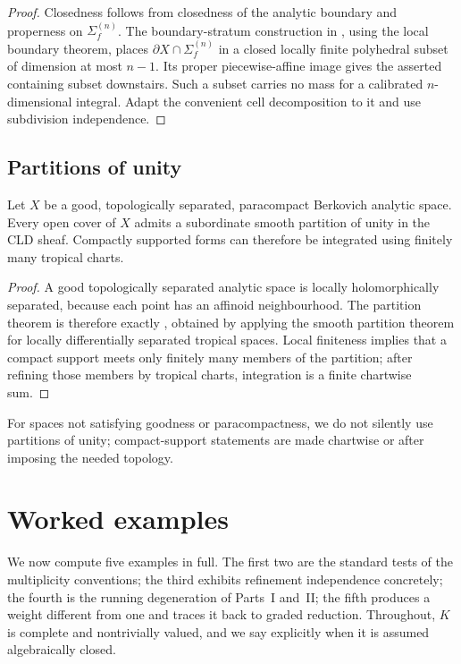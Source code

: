 \begin{proof}
Closedness follows from closedness of the analytic boundary and properness
on $\Sigma_f^{(n)}$. The boundary-stratum construction in
\cite[Lemma~14.1.5]{CLD25}, using the local boundary theorem, places
$\partial X\cap\Sigma_f^{(n)}$ in a closed locally finite polyhedral
subset of dimension at most $n-1$. Its proper piecewise-affine image gives
the asserted containing subset downstairs. Such a subset carries no mass
for a calibrated $n$-dimensional integral. Adapt the convenient cell
decomposition to it and use subdivision independence.
\end{proof}

\subsection{Partitions of unity}

\begin{theorem}\label{thm:cld-partitions-unity}
Let $X$ be a good, topologically separated, paracompact Berkovich analytic
space. Every open cover of $X$ admits a subordinate smooth partition of
unity in the CLD sheaf. Compactly supported forms can therefore be integrated
using finitely many tropical charts.
\end{theorem}
\begin{proof}
A good topologically separated analytic space is locally holomorphically
separated, because each point has an affinoid neighbourhood. The partition
theorem is therefore exactly \cite[Proposition~15.2.8]{CLD25}, obtained by
applying the smooth partition theorem for locally differentially separated
tropical spaces. Local finiteness implies that a compact support meets only
finitely many members of the partition; after refining those members by
tropical charts, integration is a finite chartwise sum.
\end{proof}

For spaces not satisfying goodness or paracompactness, we do not silently use
partitions of unity; compact-support statements are made chartwise or after
imposing the needed topology.

\section{Worked examples}
\label{sec:trop-worked}

We now compute five examples in full. The first two are the standard tests
of the multiplicity conventions; the third exhibits refinement independence
concretely; the fourth is the running degeneration of Parts~I and~II; the
fifth produces a weight different from one and traces it back to graded
reduction. Throughout, $K$ is complete and nontrivially valued, and we say
explicitly when it is assumed algebraically closed.

